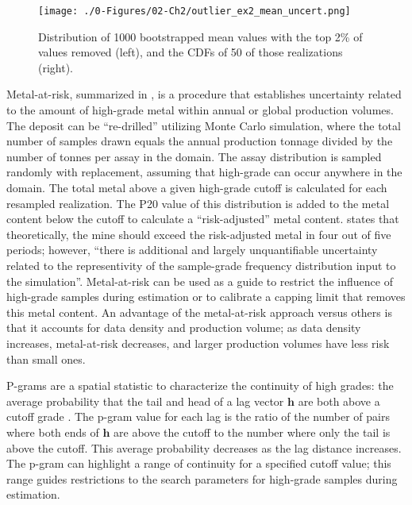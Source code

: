 \begin{figure}[htb!]
    \centering
    \texttt{[image: ./0-Figures/02-Ch2/outlier\_ex2\_mean\_uncert.png]}
    \caption{Distribution of 1000 bootstrapped mean values with the top 2\% of values removed (left), and the \glspl{CDF} of 50 of those realizations (right). }
    \label{fig:outlier_ex2_mean_uncert}
\end{figure}

Metal-at-risk, summarized in \cite{parker2006}, is a procedure that establishes uncertainty related to the amount of high-grade metal within annual or global production volumes. The deposit can be ``re-drilled'' utilizing Monte Carlo simulation, where the total number of samples drawn equals the annual production tonnage divided by the number of tonnes per assay in the domain. The assay distribution is sampled randomly with replacement, assuming that high-grade can occur anywhere in the domain. The total metal above a given high-grade cutoff is calculated for each resampled realization. The P20 value of this distribution is added to the metal content below the cutoff to calculate a ``risk-adjusted'' metal content. \cite{parker2006} states that theoretically, the mine should exceed the risk-adjusted metal in four out of five periods; however, ``there is additional and largely unquantifiable uncertainty related to the representivity of the sample-grade frequency distribution input to the simulation''. Metal-at-risk can be used as a guide to restrict the influence of high-grade samples during estimation or to calibrate a capping limit that removes this metal content. An advantage of the metal-at-risk approach versus others is that it accounts for data density and production volume; as data density increases, metal-at-risk decreases, and larger production volumes have less risk than small ones.

P-grams are a spatial statistic to characterize the continuity of high grades: the average probability that the tail and head of a lag vector $\mathbf{h}$ are both above a cutoff grade \citep{leuangthong2015dealing, nowak2019optimal}. The p-gram value for each lag is the ratio of the number of pairs where both ends of $\mathbf{h}$ are above the cutoff to the number where only the tail is above the cutoff. This average probability decreases as the lag distance increases. The p-gram can highlight a range of continuity for a specified cutoff value; this range guides restrictions to the search parameters for high-grade samples during estimation.

